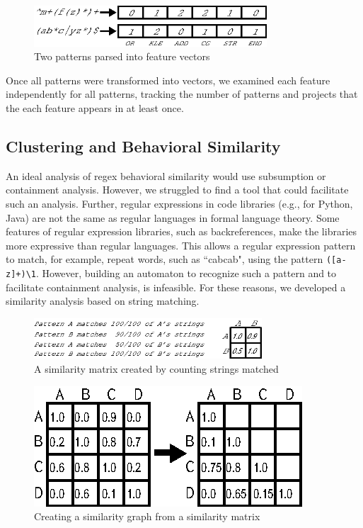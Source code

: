 \begin{figure}[tb]
\centering
\includegraphics[height=0.6in]{../illustrations/featureParsing.eps}
\caption{Two patterns parsed into feature vectors}
\label{fig:featureParsing}
\vspace{-12pt}
\end{figure}

Once all patterns were transformed into vectors, we examined each feature independently for all patterns, tracking the number of patterns and  projects that the each feature appears in at least once.  




\subsection{Clustering and Behavioral Similarity}
An ideal analysis of regex behavioral similarity would use subsumption or containment analysis. However, we struggled to find a tool that could facilitate such an analysis. Further, regular expressions in code libraries (e.g., for Python, Java) are not the same as regular languages in formal language theory. Some features of regular expression libraries, such as backreferences, make the libraries more expressive than regular languages. This allows a regular expression pattern to match, for example, repeat words, such as ``cabcab", using the pattern {\tt ([a-z]+)\verb!\!1}. However, building an automaton to recognize such a pattern and to facilitate containment analysis, is infeasible.
For these reasons, we developed a similarity analysis based on string matching.


\begin{figure}[tb]
\centering
\includegraphics[height=0.6in]{../illustrations/minimalMatrix.eps}
\caption{A similarity matrix created by counting strings matched}
\label{fig:minimalMatrix}
\end{figure}


\begin{figure}[tb]
\centering
\includegraphics[width=0.7\columnwidth]{../illustrations/matrixToGraph.eps}
\vspace{-6pt}
\caption{Creating a similarity graph from a similarity matrix}
\vspace{-6pt}
\label{fig:matrixToGraph}
\end{figure}

